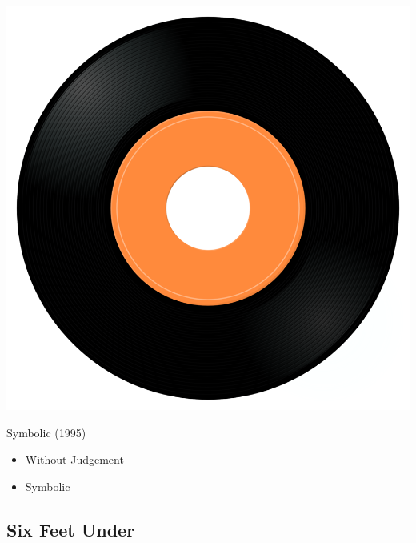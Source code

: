 \begin{minipage}[t]{0.25\textwidth}\vspace{0pt}
\captionsetup{type=figure}
\includegraphics[width=\textwidth]{Images/cover.png}
\caption*{Symbolic (1995)}
\end{minipage}
\begin{minipage}[t]{0.25\textwidth}\vspace{0pt}
\begin{itemize}[nosep,leftmargin=1em,labelwidth=*,align=left]
	\setlength{\itemsep}{0pt}
	\item Without Judgement
	\item Symbolic
\end{itemize}
\end{minipage}

\subsection{Six Feet Under}

